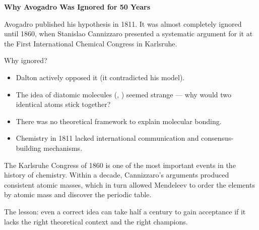 \documentclass[12pt, a4paper]{book}
\theoremstyle{definition}
\begin{document}
\begin{historybox}
\textbf{Why Avogadro Was Ignored for 50 Years}

Avogadro published his hypothesis in 1811.
It was almost completely ignored until 1860,
when Stanislao Cannizzaro presented a systematic argument
for it at the First International Chemical Congress in Karlsruhe.

Why ignored?
\begin{itemize}[nosep, leftmargin=2em]
  \item Dalton actively opposed it (it contradicted his model).
  \item The idea of diatomic molecules (, ) seemed
        strange --- why would two identical atoms stick together?
  \item There was no theoretical framework to explain molecular bonding.
  \item Chemistry in 1811 lacked international communication
        and consensus-building mechanisms.
\end{itemize}

The Karlsruhe Congress of 1860 is one of the most important
events in the history of chemistry.
Within a decade, Cannizzaro's arguments produced consistent
atomic masses, which in turn allowed Mendeleev to order
the elements by atomic mass and discover the periodic table.

The lesson: even a correct idea can take half a century
to gain acceptance if it lacks the right theoretical
context and the right champions.
\end{historybox}
\end{document}
